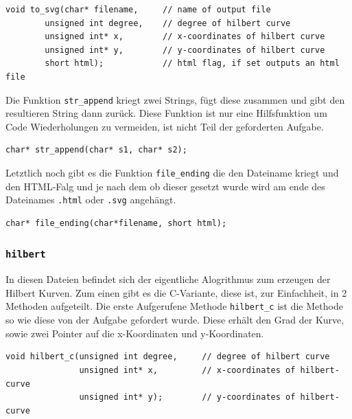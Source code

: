 \documentclass[course=erap]{aspdoc}
\begin{document}
\begin{lstlisting}[caption={Signatur von to\_svg},belowcaptionskip=0.6cm]
void to_svg(char* filename,     // name of output file
        unsigned int degree,    // degree of hilbert curve
        unsigned int* x,        // x-coordinates of hilbert curve
        unsigned int* y,        // y-coordinates of hilbert curve
        short html);            // html flag, if set outputs an html file
\end{lstlisting}

Die Funktion \lstinline{str_append} kriegt zwei Strings, fügt diese zusammen
und gibt den resultieren String dann zurück. Diese Funktion ist nur eine
Hilfsfunktion um Code Wiederholungen zu vermeiden, ist nicht Teil der
geforderten Aufgabe.

\begin{lstlisting}[caption={Signatur von str\_append},belowcaptionskip=0.6cm]
char* str_append(char* s1, char* s2);
\end{lstlisting}

Letztlich noch gibt es die Funktion \lstinline{file_ending} die den Dateiname
kriegt und den HTML-Falg und je nach dem ob dieser gesetzt wurde wird am ende
des Dateinames \lstinline{.html} oder \lstinline{.svg} angehängt.

\begin{lstlisting}[caption={Signatur von file\_ending},belowcaptionskip=0.6cm]
char* file_ending(char*filename, short html);
\end{lstlisting}

\subsubsection{\lstinline{hilbert}}\label{hilbert}
In diesen Dateien befindet sich der eigentliche Alogrithmus zum erzeugen der
Hilbert Kurven.  Zum einen gibt es die C-Variante, diese ist, zur Einfachheit,
in 2 Methoden aufgeteilt.  Die erste Aufgerufene Methode \lstinline{hilbert_c}
ist die Methode so wie diese von der Aufgabe gefordert wurde. Diese erhält den
Grad der Kurve, sowie zwei Pointer auf die x-Koordinaten und y-Koordinaten.

\begin{lstlisting}[caption={Signatur von hilbert\_c},belowcaptionskip=0.6cm]
void hilbert_c(unsigned int degree,     // degree of hilbert curve
               unsigned int* x,         // x-coordinates of hilbert-curve
               unsigned int* y);        // y-coordinates of hilbert-curve
\end{lstlisting}
\end{document}
